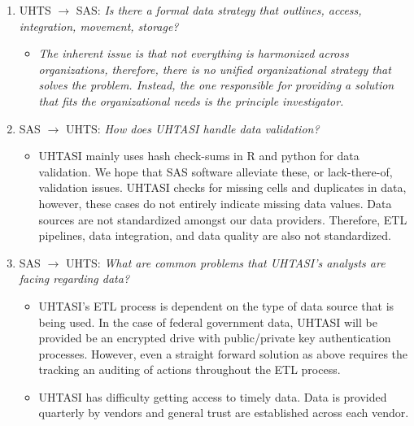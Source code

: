 \begin{enumerate}
    \item UHTS $\rightarrow$ SAS: \textit{Is there a formal data strategy that outlines, access, integration, movement, storage?}
    \begin{itemize}
        \item \textit{The inherent issue is that not everything is harmonized across organizations, therefore, there is no unified organizational strategy that solves the problem. Instead, the one responsible for providing a solution that fits the organizational needs is the principle investigator.}
    \end{itemize}
    \item SAS $\rightarrow$ UHTS: \textit{How does UHTASI handle data validation?}
    \begin{itemize}
        \item UHTASI mainly uses hash check-sums in R and python for data validation. We hope that SAS software alleviate these, or lack-there-of, validation issues. UHTASI checks for missing cells and duplicates in data, however, these cases do not entirely indicate missing data values. Data sources are not standardized amongst our data providers. Therefore, ETL pipelines, data integration, and data quality are also not standardized.
    \end{itemize}
    \item SAS $\rightarrow$ UHTS: \textit{What are common problems that UHTASI's analysts are facing regarding data?}
    \begin{itemize}
        \item UHTASI's ETL process is dependent on the type of data source that is being used. In the case of federal government data, UHTASI will be provided be an encrypted drive with public/private key authentication processes. However, even a straight forward solution as above requires the tracking an auditing of actions throughout the ETL process. 
        \item UHTASI has difficulty getting access to timely data. Data is provided quarterly by vendors and general trust are established across each vendor.
    \end{itemize}
\end{enumerate}

